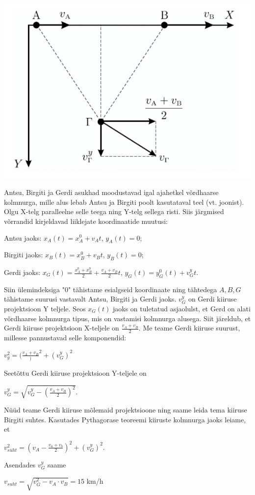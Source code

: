 \documentclass[11pt]{article}
\begin{document}
{{\ifSolution
\begin{center}
	\includegraphics[width=0.5\linewidth]{2015-v3p-10-lah.PNG}
\end{center}
Antsu, Birgiti ja Gerdi asukhad moodustavad igal ajahetkel võrdhaarse kolmnurga, mille alus lebab Antsu ja Birgiti poolt kasutataval teel (vt. joonist). 
Olgu X-telg paralleelne selle teega ning Y-telg sellega risti. Siis järgmised võrrandid kirjeldavad liiklejate koordinaatide muutusi:
\begin{center}
Antsu jaoks: $x_A(t) = x_A ^0 + v_At$, $y_A(t) = 0$;
\end{center}
\begin{center}
Birgiti jaoks: $x_B(t) = x_B ^0 + v_Bt$, $y_B(t) = 0$;
\end{center}
\begin{center}
Gerdi jaoks: $x_G(t) = \frac{x_A ^0 + x_B ^0}{2} + \frac{v_A + v_B}{2}t$, $y_G(t) = y_G ^0(t) + v_G ^y t$.
\end{center}
Siin ülemindeksiga "0" tähistame esialgseid koordinaate ning tähtedega $A, B, G$ tähistame suurusi vastavalt Antsu, Birgiti ja Gerdi jaoks. $v_G ^y$ on Gerdi kiiruse projektsioon Y teljele. Seos $x_G(t)$ jaoks on tuletatud asjaolulst, et Gerd on alati võrdhaarse kolmnurga tipus, mis on vastamisi kolmnurga alusega. Siit järeldub, et Gerdi kiiruse projektsioon X-teljele on $\frac{v_A + v_B }{2}$.
Me teame Gerdi kiiruse suurust, millesse pannustavad selle komponendid:
\begin{center}
$v_g ^2 = (\frac{v_A + v_B})^2 + (v_G ^y)^2$ 
\end{center}
Seetõttu Gerdi kiiruse projektsioon Y-teljele on
\begin{center}
$v_G^y =\sqrt{v_G^y - (\frac{v_A + v_B}{2})^2}$.
\end{center}
Nüüd teame Gerdi kiiruse mõlemaid projektsioone ning saame leida tema kiiruse Birgiti suhtes. Kasutades Pythagorase teoreemi kiiruste kolmnurga jaoks leiame, et
\begin{center}
$v_{suht} ^2 = (v_A - \frac{v_a + v_b}{2})^2 + (v_G ^y)^2$.
\end{center}
Asendades $v_G ^y$ saame
\begin{center}
$v_{suht} = \sqrt{v_G ^2 - v_A \cdot v_B } = 15$ km/h
\end{center}
\fi
}

}
\end{document}
